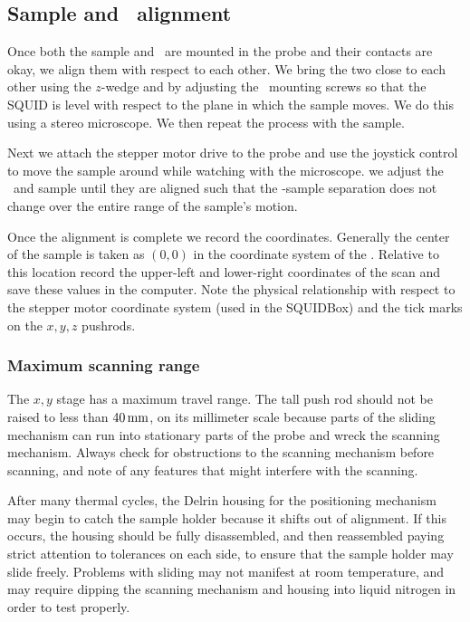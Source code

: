  

\subsection{Sample and \squid\ alignment}

Once both the sample and \squid\ are mounted in the probe and their contacts
are okay, we
align them with respect to each other. We bring the two close to each other
using the $z$-wedge and by adjusting the \squid\ mounting screws so that 
the SQUID is 
level with respect to the plane in which the sample moves. We do this using 
a stereo microscope. We then
repeat the process with the sample. 

Next we attach the stepper motor drive to the probe and use the joystick 
control to move the sample around while watching with the microscope. 
we adjust the \squid\ and sample until they are aligned such that the
\squid -sample separation does not change over the entire range of the 
sample's motion. 

Once the alignment is complete we record the coordinates. Generally the center
of the sample is taken as $(0,0)$ in the coordinate system of the 
\squidbox. Relative to this location record the
upper-left and lower-right coordinates of the scan and save these
values in the computer. Note the physical relationship
with respect to the stepper motor coordinate system (used in the 
SQUIDBox) and the tick marks on the $x,y,z$ pushrods. 

\subsubsection{Maximum scanning range}

The $x,y$ stage has a maximum travel range. 
The tall push rod should not be raised to less than $40\,\mathrm{mm}$,
on its millimeter scale because
parts of the sliding mechanism can 
run into stationary parts of the probe and wreck the scanning
mechanism. 
Always check for
obstructions to the scanning mechanism before scanning, and note of any
features that might interfere with the scanning. 

After many thermal cycles, the Delrin housing for the positioning mechanism
may begin to catch the sample holder because it shifts out of 
alignment. If this occurs, the housing should be
fully disassembled, and then reassembled paying strict attention to tolerances
on each side, to ensure that the sample holder may slide freely. Problems with
sliding may not manifest at room temperature, and may require dipping the 
scanning mechanism 
and housing into liquid nitrogen in order to test properly. 

